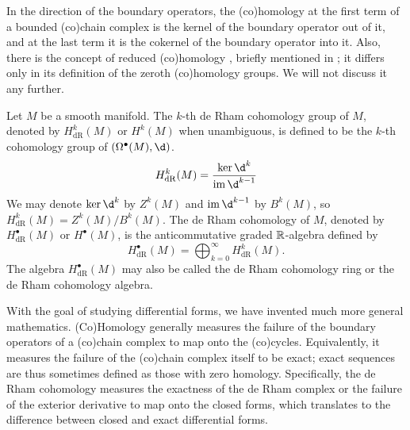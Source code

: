 \documentclass[a4paper,12pt]{article}
\begin{document}
\begin{remark}
    In the direction of the boundary operators, the (co)homology at the first term of a bounded (co)chain complex is the kernel of the boundary operator out of it, and at the last term it is the cokernel of the boundary operator into it.
    Also, there is the concept of reduced (co)homology \cite{wikipedia_reduced_homology}, briefly mentioned in ; it differs only in its definition of the zeroth (co)homology groups.
    We will not discuss it any further.
\end{remark}
\begin{definition}\label{def:de_rham_cohomology}
    Let $M$ be a smooth manifold.
    The $k$-th de Rham cohomology group of $M$, denoted by $H^k_{\mathrm{dR}}(M)$ or $H^k(M)$ when unambiguous, is defined to be the $k$-th cohomology group of $(\Omega^\bullet(M), \d)$.
    \begin{equation}
        H^k_{\mathrm{dR}}(M) = \frac{\ker \d^k}{\im \d^{k-1}}
    \end{equation}
    We may denote $\ker \d^k$ by $Z^k(M)$ and $\im \d^{k-1}$ by $B^k(M)$, so $H^k_{\mathrm{dR}}(M) = Z^k(M)/B^k(M)$.
    The de Rham cohomology of $M$, denoted by $H^\bullet_{\mathrm{dR}}(M)$ or $H^\bullet(M)$, is the anticommutative graded $\mathbb{R}$-algebra defined by
    \begin{equation}
        H^\bullet_{\mathrm{dR}}(M) = \bigoplus_{k=0}^\infty H^k_{\mathrm{dR}}(M).
    \end{equation}
    The algebra $H^\bullet_{\mathrm{dR}}(M)$ may also be called the de Rham cohomology ring or the de Rham cohomology algebra.
\end{definition}
With the goal of studying differential forms, we have invented much more general mathematics.
(Co)Homology generally measures the failure of the boundary operators of a (co)chain complex to map onto the (co)cycles.
Equivalently, it measures the failure of the (co)chain complex itself to be exact; exact sequences are thus sometimes defined as those with zero homology.
Specifically, the de Rham cohomology measures the exactness of the de Rham complex or the failure of the exterior derivative to map onto the closed forms, which translates to the difference between closed and exact differential forms.
\end{document}

